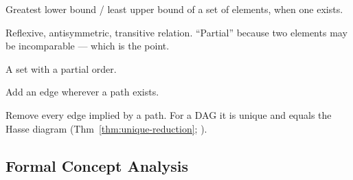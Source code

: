 \begin{description}[leftmargin=0pt,labelindent=0pt,style=nextline,
                    font=\normalfont\bfseries]
\item[Meet / join] Greatest lower bound / least upper bound of a set of
  elements, when one exists.
\item[Partial order] Reflexive, antisymmetric, transitive relation. ``Partial''
  because two elements may be incomparable --- which is the point.
\item[Poset] A set with a partial order.
\item[Transitive closure] Add an edge wherever a path exists.
\item[Transitive reduction] Remove every edge implied by a path. For a DAG it
  is unique and equals the Hasse diagram (Thm~\ref{thm:unique-reduction};
  \citealp{aho1972}).
\end{description}

\subsection*{Formal Concept Analysis}


